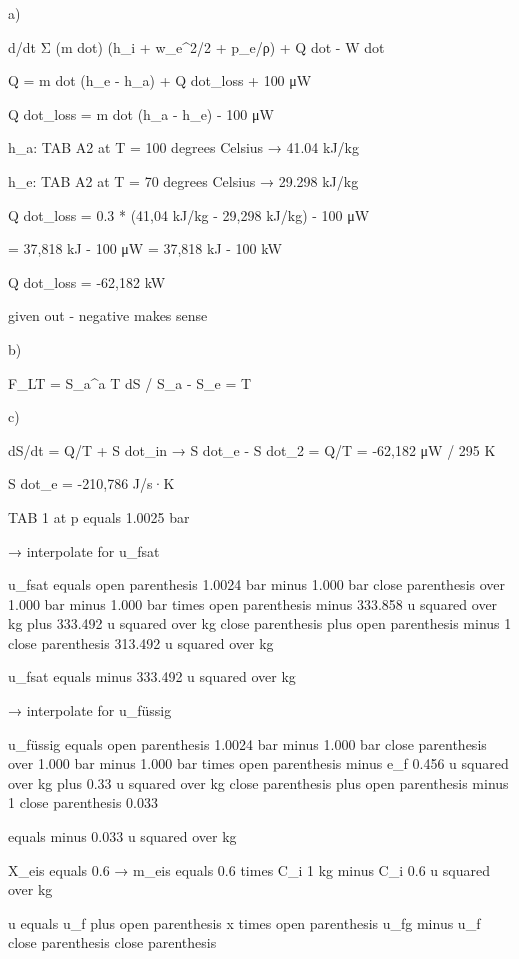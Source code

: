 a) 

d/dt Σ (m dot) (h_i + w_e^2/2 + p_e/ρ) + Q dot - W dot

Q = m dot (h_e - h_a) + Q dot_loss + 100 μW

Q dot_loss = m dot (h_a - h_e) - 100 μW

h_a: TAB A2 at T = 100 degrees Celsius → 41.04 kJ/kg

h_e: TAB A2 at T = 70 degrees Celsius → 29.298 kJ/kg

Q dot_loss = 0.3 * (41,04 kJ/kg - 29,298 kJ/kg) - 100 μW

= 37,818 kJ - 100 μW = 37,818 kJ - 100 kW

Q dot_loss = -62,182 kW

given out - negative makes sense

b)

F_LT = S_a^a T dS / S_a - S_e = T

c)

dS/dt = Q/T + S dot_in → S dot_e - S dot_2 = Q/T = -62,182 μW / 295 K

S dot_e = -210,786 J/s·K

TAB 1 at p equals 1.0025 bar

→ interpolate for u_fsat

u_fsat equals open parenthesis 1.0024 bar minus 1.000 bar close parenthesis over 1.000 bar minus 1.000 bar times open parenthesis minus 333.858 u squared over kg plus 333.492 u squared over kg close parenthesis plus open parenthesis minus 1 close parenthesis 313.492 u squared over kg

u_fsat equals minus 333.492 u squared over kg

→ interpolate for u_füssig

u_füssig equals open parenthesis 1.0024 bar minus 1.000 bar close parenthesis over 1.000 bar minus 1.000 bar times open parenthesis minus e_f 0.456 u squared over kg plus 0.33 u squared over kg close parenthesis plus open parenthesis minus 1 close parenthesis 0.033

equals minus 0.033 u squared over kg

X_eis equals 0.6 → m_eis equals 0.6 times C_i 1 kg minus C_i 0.6 u squared over kg

u equals u_f plus open parenthesis x times open parenthesis u_fg minus u_f close parenthesis close parenthesis